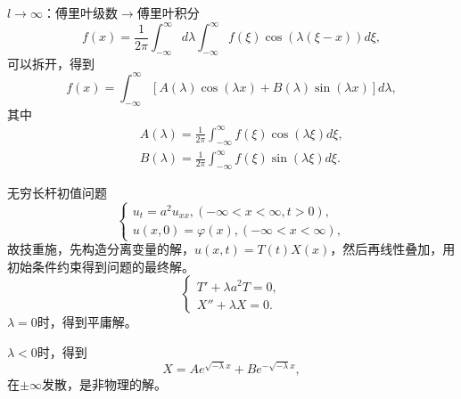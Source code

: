 \documentclass[11pt]{beamer}
\begin{document}
\begin{frame}{$l \rightarrow \infty$：傅里叶级数$\rightarrow$傅里叶积分}
\begin{equation}
f(x) = \frac{1}{2\pi} \int^\infty_{-\infty} d \lambda \int^\infty_{-\infty} f(\xi) \cos(\lambda (\xi - x)) d \xi ,
\end{equation}
可以拆开，得到
\begin{equation}
f(x) = \int^\infty_{-\infty} [ A(\lambda) \cos(\lambda x) + B(\lambda) \sin(\lambda x)] d\lambda,
\end{equation}
其中
\begin{eqnarray}
&& A(\lambda) = \frac{1}{2\pi} \int^\infty_{-\infty} f(\xi) \cos(\lambda \xi) d \xi, \\
&& B(\lambda) = \frac{1}{2\pi} \int^\infty_{-\infty} f(\xi) \sin(\lambda \xi) d \xi.
\end{eqnarray}

\end{frame}

\begin{frame}{无穷长杆初值问题}
\begin{equation}
\left\{
\begin{aligned}
u_t = a^2 u_{xx}, (-\infty < x < \infty, t>0), \\
u(x,0) = \varphi(x), (-\infty < x < \infty),
\end{aligned}
\right.
\end{equation}
故技重施，先构造分离变量的解，$u(x,t) = T(t) X(x)$，然后再线性叠加，用初始条件约束得到问题的最终解。
\begin{equation}
\left\{
\begin{aligned}
T' + \lambda a^2 T = 0, \\
X'' + \lambda X = 0.
\end{aligned}
\right.
\end{equation}
$\lambda = 0$时，得到平庸解。

$\lambda <0$时，得到
\begin{equation}
X = A e^{\sqrt{-\lambda}x} + B e^{-\sqrt{-\lambda}x},
\end{equation}
在$\pm \infty$发散，是非物理的解。
\end{frame}
\end{document}
